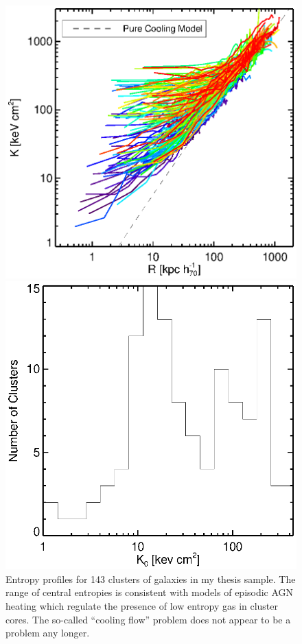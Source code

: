 \documentclass[11pt]{article}
\begin{document}
\clearpage
\begin{figure}[t]
    \begin{minipage}[t]{0.5\linewidth}
        \centering
	\includegraphics*[width=\textwidth, trim=26mm 8mm 30mm 10mm, clip]{splots}
        \caption{\small Entropy profiles for 143 clusters of galaxies
	in my thesis sample. The range of central entropies is
	consistent with models of episodic AGN heating which regulate
	the presence of low entropy gas in cluster cores. The
	so-called ``cooling flow'' problem does not appear to be a problem any
	longer.}
	\label{fig:splots}
    \end{minipage}
    \hspace{0.1in}
    \begin{minipage}[t]{0.5\linewidth}
        \centering
        \includegraphics*[width=\textwidth, trim=28mm 8mm 30mm 10mm, clip]{k0hist}

\end{minipage}
\end{figure}
\end{document}
